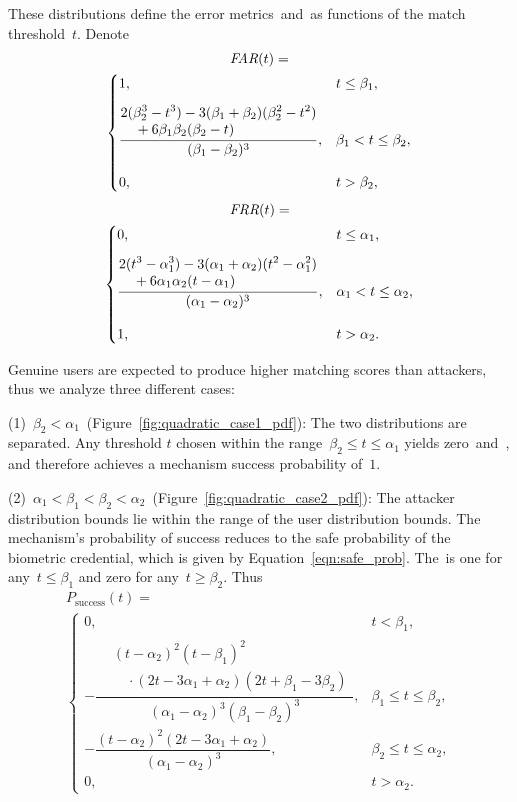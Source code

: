 \documentclass[conference,compsoc]{IEEEtran}
\begin{document}
These distributions define the error metrics~\FAR and~\FRR as functions of the match threshold~$t$. Denote
\begin{multline*}
\textit{FAR}(t)=\\
\begin{cases}
1, & t \le \beta_1,\\[8pt]
\dfrac{\begin{aligned}&2(\beta_2^3-t^3)-3(\beta_1+\beta_2)(\beta_2^2-t^2)\\&\quad+6\beta_1\beta_2(\beta_2-t)\end{aligned}}{(\beta_1-\beta_2)^3}, & \beta_1 < t \le \beta_2,\\[16pt]
0, & t > \beta_2,
\end{cases}
\end{multline*}
\begin{multline*}
\textit{FRR}(t)=\\
\begin{cases}
0, & t \le \alpha_1,\\[8pt]
\dfrac{\begin{aligned}&2(t^3-\alpha_1^3)-3(\alpha_1+\alpha_2)(t^2-\alpha_1^2)\\&\quad+6\alpha_1\alpha_2(t-\alpha_1)\end{aligned}}{(\alpha_1-\alpha_2)^3}, & \alpha_1 < t \le \alpha_2,\\[16pt]
1, & t > \alpha_2.
\end{cases}
\end{multline*}

Genuine users are expected to produce higher matching scores than attackers, thus we analyze three different cases:

(1)~$\beta_{2} < \alpha_{1}$~(Figure~\ref{fig:quadratic_case1_pdf}): The two distributions are separated. Any threshold $t$ chosen within the range~$\beta_{2} \le t \le \alpha_{1}$ yields zero~\FAR and~\FRR, and therefore achieves a mechanism success probability of~$1$.

(2)~$\alpha_{1} < \beta_{1} < \beta_{2} < \alpha_{2}$~(Figure~\ref{fig:quadratic_case2_pdf}): The attacker distribution bounds lie within the range of the user distribution bounds. The mechanism’s probability of success reduces to the safe probability of the biometric credential, which is given by Equation~\ref{eqn:safe_prob}.
The~\FAR is one for any~$t \le \beta_1$ and zero for any~$t \ge \beta_2$. Thus
\begin{multline*}
P_{\mathrm{success}}(t)=\\
\begin{cases}
0,
& t<\beta_1,\\[8pt]
-\dfrac{\begin{aligned}&(t-\alpha_2)^2(t-\beta_1)^2\\&\quad\cdot(2t-3\alpha_1+\alpha_2)(2t+\beta_1-3\beta_2)\end{aligned}}{(\alpha_1-\alpha_2)^3(\beta_1-\beta_2)^3},
& \beta_1 \le t \le \beta_2,\\[16pt]
-\dfrac{(t-\alpha_2)^2(2t-3\alpha_1+\alpha_2)}
{(\alpha_1-\alpha_2)^3},
& \beta_2 \le t \le \alpha_2,\\[8pt]
0,
& t>\alpha_2.
\end{cases}
\end{multline*}
\end{document}
